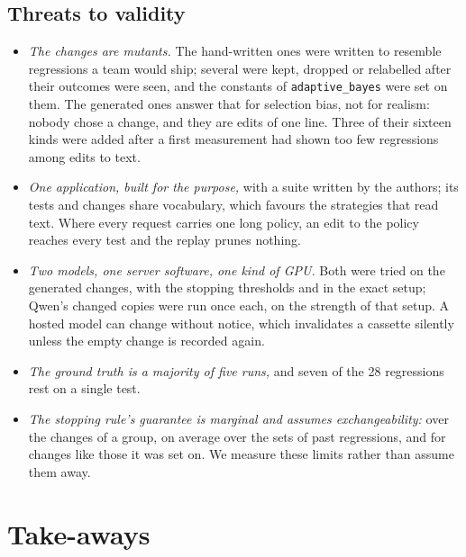 \documentclass[11pt,a4paper]{article}
\newcommand{\strat}[1]{\texttt{#1}}
\begin{document}
\subsection{Threats to validity}

\begin{itemize}
  \item \emph{The changes are mutants.} The hand-written ones were written to resemble regressions a team would
        ship; several were kept, dropped or relabelled after their outcomes were seen, and the constants of
        \strat{adaptive\_bayes} were set on them. The generated ones answer that for selection bias, not for
        realism: nobody chose a change, and they are edits of one line. Three of their sixteen kinds were added
        after a first measurement had shown too few regressions among edits to text.
  \item \emph{One application, built for the purpose,} with a suite written by the authors; its tests and changes
        share vocabulary, which favours the strategies that read text. Where every request carries one long policy,
        an edit to the policy reaches every test and the replay prunes nothing.
  \item \emph{Two models, one server software, one kind of GPU.} Both were tried on the generated changes, with
        the stopping thresholds and in the exact setup; Qwen's changed copies were run once each, on the strength
        of that setup. A hosted model can change without notice, which invalidates a cassette silently unless the
        empty change is recorded again.
  \item \emph{The ground truth is a majority of five runs,} and seven of the 28 regressions rest on a single test.
  \item \emph{The stopping rule's guarantee is marginal and assumes exchangeability:} over the changes of a group,
        on average over the sets of past regressions, and for changes like those it was set on. We measure these
        limits rather than assume them away.
\end{itemize}

\section{Take-aways}
\label{sec:takeaways}
\end{document}
